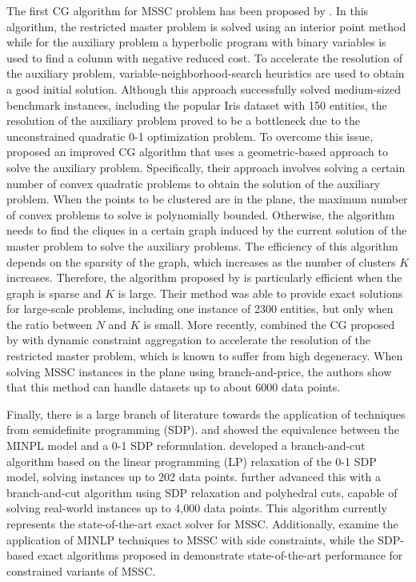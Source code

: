 The first CG algorithm for MSSC problem has been proposed by \cite{du1999interior}. In this algorithm, the restricted master problem is solved using an interior point method while for the auxiliary problem a hyperbolic program with binary variables is used to find a column with negative reduced cost. To accelerate the resolution of the auxiliary problem, variable-neighborhood-search heuristics are used to obtain a good initial solution. Although this approach successfully solved medium-sized benchmark instances, including the popular Iris dataset with 150 entities, the resolution of the auxiliary problem proved to be a bottleneck due to the unconstrained quadratic 0-1 optimization problem. To overcome this issue, \cite{aloise2012improved} proposed an improved CG algorithm that uses a geometric-based approach to solve the auxiliary problem. Specifically, their approach involves solving a certain number of convex quadratic problems to obtain the solution of the auxiliary problem. When the points to be clustered are in the plane, the maximum number of convex problems to solve is polynomially bounded. Otherwise, the algorithm needs to find the cliques in a certain graph induced by the current solution of the master problem to solve the auxiliary problems. The efficiency of this algorithm depends on the sparsity of the graph, which increases as the number of clusters $K$ increases. Therefore, the algorithm proposed by \cite{aloise2012improved} is particularly efficient when the graph is sparse and $K$ is large. Their method was able to provide exact solutions for large-scale problems, including one instance of 2300 entities, but only when the ratio between $N$ and $K$ is small. More recently, \cite{sudoso2024column} combined the CG proposed by \cite{aloise2012improved} with dynamic constraint aggregation \citep{bouarab2017dynamic} to accelerate the resolution of the restricted master problem, which is known to suffer from high degeneracy.  When solving MSSC instances in the plane using branch-and-price, the authors show that this method can handle datasets up to about 6000 data points.

Finally, there is a large branch of literature towards the application of techniques from semidefinite programming (SDP). \cite{peng2005new} and \cite{peng2007approximating} showed the equivalence between the MINPL model and a 0-1 SDP reformulation. \cite{aloise2009branch} developed a branch-and-cut algorithm based on the linear programming (LP) relaxation of the 0-1 SDP model, solving instances up to 202 data points. \cite{piccialli2022sos} further advanced this with a branch-and-cut algorithm using SDP relaxation and polyhedral cuts, capable of solving real-world instances up to 4,000 data points. This algorithm currently represents the state-of-the-art exact solver for MSSC. Additionally, \cite{liberti2022side} examine the application of MINLP techniques to MSSC with side constraints, while the SDP-based exact algorithms proposed in \cite{piccialli2022semi, piccialli2023global} demonstrate state-of-the-art performance for constrained variants of MSSC.